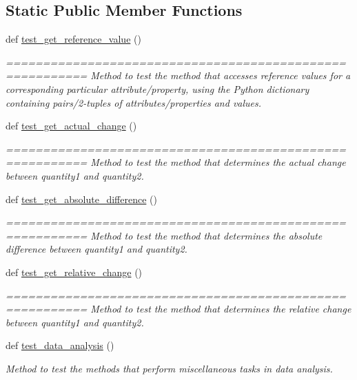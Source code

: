\subsection*{Static Public Member Functions}
\begin{DoxyCompactItemize}
\item 
def \hyperlink{classstatistics_1_1test__data__analysis__tool_1_1data__analysis__tester_ac5dee1d2f7bb003c3b322ec9692766af}{test\+\_\+get\+\_\+reference\+\_\+value} ()
\begin{DoxyCompactList}\small\item\em ========================================================= Method to test the method that accesses reference values for a corresponding particular attribute/property, using the Python dictionary containing pairs/2-\/tuples of attributes/properties and values. \end{DoxyCompactList}\item 
def \hyperlink{classstatistics_1_1test__data__analysis__tool_1_1data__analysis__tester_af355b89d75dbd6f03b47a52bcfdb9025}{test\+\_\+get\+\_\+actual\+\_\+change} ()
\begin{DoxyCompactList}\small\item\em ========================================================= Method to test the method that determines the actual change between quantity1 and quantity2. \end{DoxyCompactList}\item 
def \hyperlink{classstatistics_1_1test__data__analysis__tool_1_1data__analysis__tester_a3b1f6f4fd16ef986ead81484c80fc164}{test\+\_\+get\+\_\+absolute\+\_\+difference} ()
\begin{DoxyCompactList}\small\item\em ========================================================= Method to test the method that determines the absolute difference between quantity1 and quantity2. \end{DoxyCompactList}\item 
def \hyperlink{classstatistics_1_1test__data__analysis__tool_1_1data__analysis__tester_a8ca74240a173de29733a73137df4bd95}{test\+\_\+get\+\_\+relative\+\_\+change} ()
\begin{DoxyCompactList}\small\item\em ========================================================= Method to test the method that determines the relative change between quantity1 and quantity2. \end{DoxyCompactList}\item 
def \hyperlink{classstatistics_1_1test__data__analysis__tool_1_1data__analysis__tester_a770fcf75cc2e1a9e8e840d1f3bb770af}{test\+\_\+data\+\_\+analysis} ()
\begin{DoxyCompactList}\small\item\em Method to test the methods that perform miscellaneous tasks in data analysis. \end{DoxyCompactList}\end{DoxyCompactItemize}


